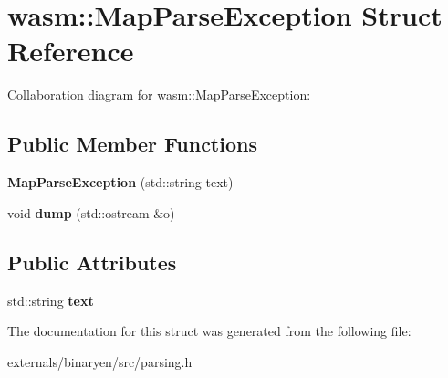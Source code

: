 \hypertarget{structwasm_1_1_map_parse_exception}{}\section{wasm\+:\+:Map\+Parse\+Exception Struct Reference}
\label{structwasm_1_1_map_parse_exception}


Collaboration diagram for wasm\+:\+:Map\+Parse\+Exception\+:
\subsection*{Public Member Functions}
\begin{DoxyCompactItemize}
\item 
\mbox{\label{structwasm_1_1_map_parse_exception_a6fdfa1be95974bf0951e3b9d58b9e779}} 
{\bfseries Map\+Parse\+Exception} (std\+::string text)
\item 
\mbox{\label{structwasm_1_1_map_parse_exception_a3daf350e5fb01b1da655d9c27cf3794c}} 
void {\bfseries dump} (std\+::ostream \&o)
\end{DoxyCompactItemize}
\subsection*{Public Attributes}
\begin{DoxyCompactItemize}
\item 
\mbox{\label{structwasm_1_1_map_parse_exception_a619f86da17783708a29df83dcb997cc5}} 
std\+::string {\bfseries text}
\end{DoxyCompactItemize}


The documentation for this struct was generated from the following file\+:\begin{DoxyCompactItemize}
\item 
externals/binaryen/src/parsing.\+h\end{DoxyCompactItemize}
